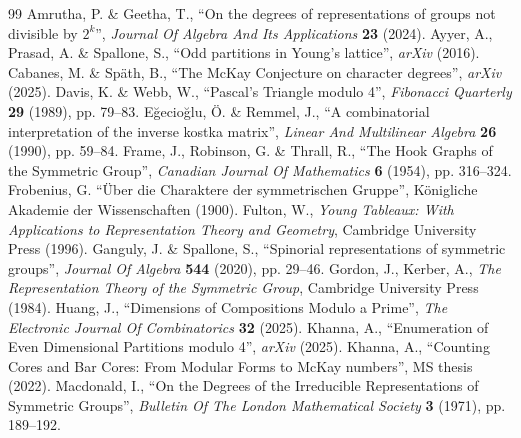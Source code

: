 \documentclass[12pt]{amsart}
\theoremstyle{definition}
\numberwithin{equation}{section}
\begin{document}
\begin{thebibliography}{99}
Amrutha, P. \& Geetha, T., ``On the degrees of representations of groups not divisible by $2^k$'', {\em Journal Of Algebra And Its Applications} \textbf{23} (2024).
 Ayyer, A., Prasad, A. \& Spallone, S., ``Odd partitions in Young's lattice'', \textit{arXiv} (2016).
 Cabanes, M. \& Späth, B., ``The McKay Conjecture on character degrees'', \textit{arXiv} (2025).
 Davis, K. \& Webb, W., ``Pascal's Triangle modulo 4'', {\em Fibonacci Quarterly} \textbf{29} (1989), pp. 79--83.
 E\u{g}ecio\u{g}lu, \"{O}. \& Remmel, J., ``A combinatorial interpretation of the inverse kostka matrix'', {\em Linear And Multilinear Algebra} \textbf{26} (1990), pp. 59--84. 
 Frame, J., Robinson, G. \& Thrall, R., ``The Hook Graphs of the Symmetric Group'', {\em Canadian Journal Of Mathematics} \textbf{6} (1954), pp. 316--324.
 Frobenius, G. ``{Über die Charaktere der symmetrischen Gruppe}'', Königliche Akademie der Wissenschaften (1900).
 Fulton, W., \textit{Young Tableaux: With Applications to Representation Theory and Geometry}, Cambridge University Press (1996).
 Ganguly, J. \& Spallone, S., ``Spinorial representations of symmetric groups'', {\em Journal Of Algebra} \textbf{544} (2020), pp. 29--46.
Gordon, J., Kerber, A., \textit{The Representation Theory of the Symmetric Group}, Cambridge University Press (1984).
 Huang, J., ``Dimensions of Compositions Modulo a Prime'', {\em The Electronic Journal Of Combinatorics} \textbf{32} (2025).
 Khanna, A., ``Enumeration of Even Dimensional Partitions modulo 4'', \textit{arXiv} (2025).
 Khanna, A., ``Counting Cores and Bar Cores: From Modular Forms to McKay numbers'', MS thesis  (2022).
Macdonald, I., ``On the Degrees of the Irreducible Representations of Symmetric Groups'', {\em Bulletin Of The London Mathematical Society} \textbf{3} (1971), pp. 189--192.

\end{thebibliography}
\end{document}
